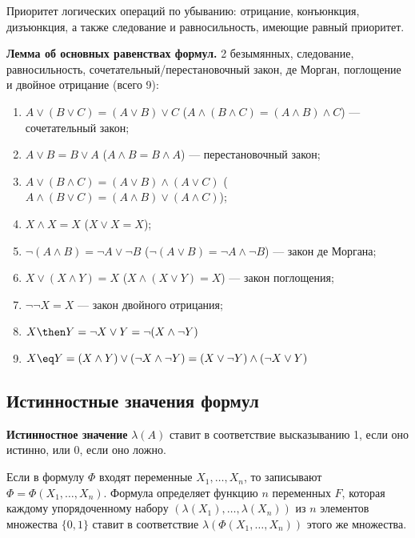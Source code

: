 \dftion Приоритет логических операций по убыванию: отрицание, конъюнкция, дизъюнкция, а также следование и равносильность, имеющие равный приоритет.

\textbf{Лемма об основных равенствах формул.} \label{q1:lemma}
2 безымянных, следование, равносильность, сочетательный/перестановочный закон, де Морган, поглощение и двойное отрицание (всего 9):
\begin{enumerate}
    \item $A \lor (B \lor C) = (A \lor B) \lor C$ \Big($A \land (B \land C) = (A \land B) \land C$\Big) --- сочетательный закон;
    \item $A \lor B = B \lor A$ \Big($A \land B = B \land A$\Big) --- перестановочный закон;
    \item $A \lor (B \land C) = (A \lor B) \land (A \lor C)$ \Big($A \land (B \lor C) = (A \land B) \lor (A \land C)$\Big);
    \item $X \land X = X$ \Big($X \lor X = X$\Big);
    \item $\lnot(A \land B) = \lnot A \lor \lnot B$ \Big($\lnot(A \lor B) = \lnot A \land \lnot B$\Big) --- закон де Моргана;
    \item $X \lor (X \land Y) = X$ \Big($X \land (X \lor Y) = X$\Big) --- закон поглощения;
    \item $\lnot \lnot X = X$ --- закон двойного отрицания;
    \item $X \then Y = \lnot X \lor Y = \lnot (X \land \lnot Y)$
    \item $X \eq Y = (X \land Y) \lor (\lnot X \land \lnot Y) = (X \lor \lnot Y) \land (\lnot X \lor Y)$
\end{enumerate}

\subsection{Истинностные значения формул}
\dftion \textbf{Истинностное значение} $\lambda(A)$ ставит в соответствие высказыванию 1, если оно истинно, или 0, если оно ложно.

\dftion Если в формулу $\Phi$ входят переменные $X_1, \dots, X_n$, то записывают $\Phi = \Phi(X_1, \dots, X_n)$. Формула определяет функцию $n$ переменных $F$, которая каждому упорядоченному набору $(\lambda(X_1), \dots, \lambda(X_n))$ из $n$ элементов множества $\{0, 1\}$ ставит в соответствие $\lambda(\Phi(X_1, \dots, X_n))$ этого же множества.
